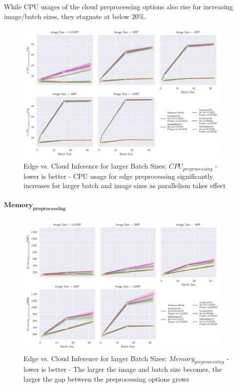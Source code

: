 While CPU usages of the cloud preprocessing options also rise for increasing image/batch sizes, they stagnate at below $20\%$.
\begin{figure}[!htb]
\centering
\includegraphics[width=0.95\textwidth]{./Bilder/single_plots/batch_size_plots/Effects_of_Batch_size_Preprocessing_CPU_Usage.pdf}
\caption[Edge vs. Cloud Inference for larger Batch Sizes:  $CPU_{preprocessing}$ - lower is better]{Edge vs. Cloud Inference for larger Batch Sizes:  $CPU_{preprocessing}$ - lower is better - CPU usage for edge preprocessing significantly increases for larger batch and image sizes as parallelism takes effect }
\label{fig:BatchSizePreproCPU}
\end{figure}

\paragraph{$\mathbf{Memory_{preprocessing}}$}
\begin{figure}[!htb]
\centering
\includegraphics[width=0.95\textwidth]{./Bilder/single_plots/batch_size_plots/Effects_of_Batch_size_Preprocessing_Memory.pdf}
\caption[Edge vs. Cloud Inference for larger Batch Sizes:  $Memory_{preprocessing}$ - lower is better]{Edge vs. Cloud Inference for larger Batch Sizes:  $Memory_{preprocessing}$ - lower is better - The larger the image and batch size becomes, the larger the gap between the preprocessing options grows}
\label{fig:BatchSizePreproMemory}
\end{figure}

